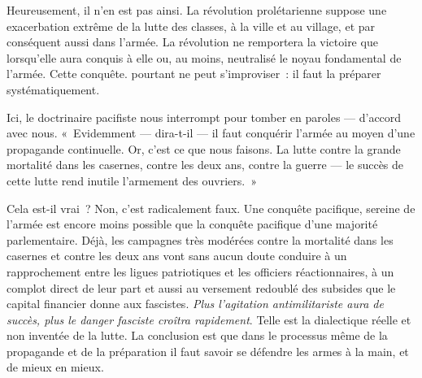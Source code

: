 \documentclass[french,twoside]{book} %
\begin{document}
Heureusement, il n’en est pas ainsi. La révolution prolétarienne suppose une exacerbation extrême de la lutte des classes, à la ville et au village, et par conséquent aussi dans l’armée. La révolution ne remportera la victoire que lorsqu’elle aura conquis à elle ou, au moins, neutralisé le noyau fondamental de l’armée. Cette conquête. pourtant ne peut s’improviser : il faut la préparer systématiquement.\par
Ici, le doctrinaire pacifiste nous interrompt pour tomber en paroles — d’accord avec nous. « Evidemment — dira-t-il — il faut conquérir l’armée au moyen d’une propagande continuelle. Or, c’est ce que nous faisons.  La lutte contre la grande mortalité dans les casernes, contre les deux ans, contre la guerre — le succès de cette lutte rend inutile l’armement des ouvriers. »\par
Cela est-il vrai ? Non, c’est radicalement faux. Une conquête pacifique, sereine de l’armée est encore moins possible que la conquête pacifique d’une majorité parlementaire. Déjà, les campagnes très modérées contre la mortalité dans les casernes et contre les deux ans vont sans aucun doute conduire à un rapprochement entre les ligues patriotiques et les officiers réactionnaires, à un complot direct de leur part et aussi au versement redoublé des subsides que le capital financier donne aux fascistes. \emph{Plus l’agitation antimilitariste aura de succès, plus le danger fasciste croîtra rapidement}. Telle est la dialectique réelle et non inventée de la lutte. La conclusion est que dans le processus même de la propagande et de la préparation il faut savoir se défendre les armes à la main, et de mieux en mieux.
\end{document}
